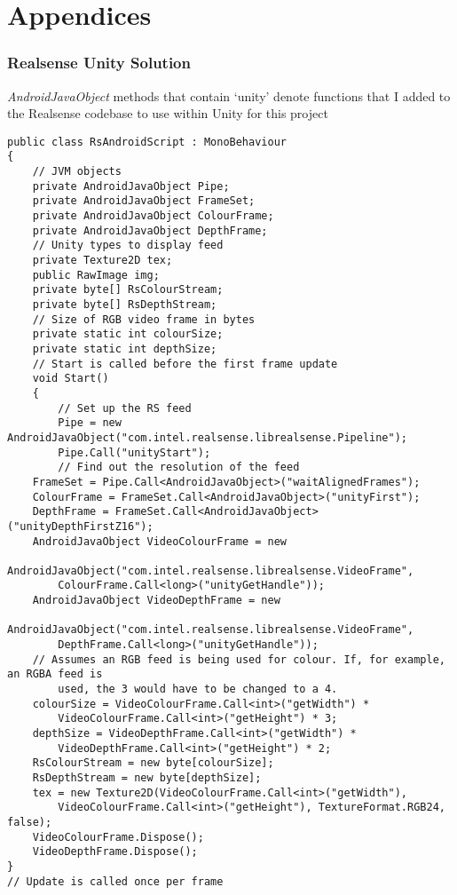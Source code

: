 \part{Appendices}
    \section{Realsense Unity Solution}
    {\slshape AndroidJavaObject} methods that contain `unity' denote functions that I added to the Realsense codebase to use within Unity for this project
    \label{appendix:rsunitysol}
    \begin{lstlisting}[style=CSharpStyle]
public class RsAndroidScript : MonoBehaviour
{
    // JVM objects
    private AndroidJavaObject Pipe;
    private AndroidJavaObject FrameSet;
    private AndroidJavaObject ColourFrame;
    private AndroidJavaObject DepthFrame;
    // Unity types to display feed
    private Texture2D tex;
    public RawImage img;
    private byte[] RsColourStream;
    private byte[] RsDepthStream;
    // Size of RGB video frame in bytes
    private static int colourSize;
    private static int depthSize;
    // Start is called before the first frame update
    void Start()
    {
        // Set up the RS feed
        Pipe = new AndroidJavaObject("com.intel.realsense.librealsense.Pipeline");
        Pipe.Call("unityStart");
        // Find out the resolution of the feed
    FrameSet = Pipe.Call<AndroidJavaObject>("waitAlignedFrames");
    ColourFrame = FrameSet.Call<AndroidJavaObject>("unityFirst");
    DepthFrame = FrameSet.Call<AndroidJavaObject>("unityDepthFirstZ16");
    AndroidJavaObject VideoColourFrame = new
        AndroidJavaObject("com.intel.realsense.librealsense.VideoFrame",
        ColourFrame.Call<long>("unityGetHandle"));
    AndroidJavaObject VideoDepthFrame = new
        AndroidJavaObject("com.intel.realsense.librealsense.VideoFrame",
        DepthFrame.Call<long>("unityGetHandle"));
    // Assumes an RGB feed is being used for colour. If, for example, an RGBA feed is
        used, the 3 would have to be changed to a 4.
    colourSize = VideoColourFrame.Call<int>("getWidth") *
        VideoColourFrame.Call<int>("getHeight") * 3;
    depthSize = VideoDepthFrame.Call<int>("getWidth") *
        VideoDepthFrame.Call<int>("getHeight") * 2;
    RsColourStream = new byte[colourSize];
    RsDepthStream = new byte[depthSize];
    tex = new Texture2D(VideoColourFrame.Call<int>("getWidth"),
        VideoColourFrame.Call<int>("getHeight"), TextureFormat.RGB24, false);
    VideoColourFrame.Dispose();
    VideoDepthFrame.Dispose();
}
// Update is called once per frame

\end{lstlisting}
